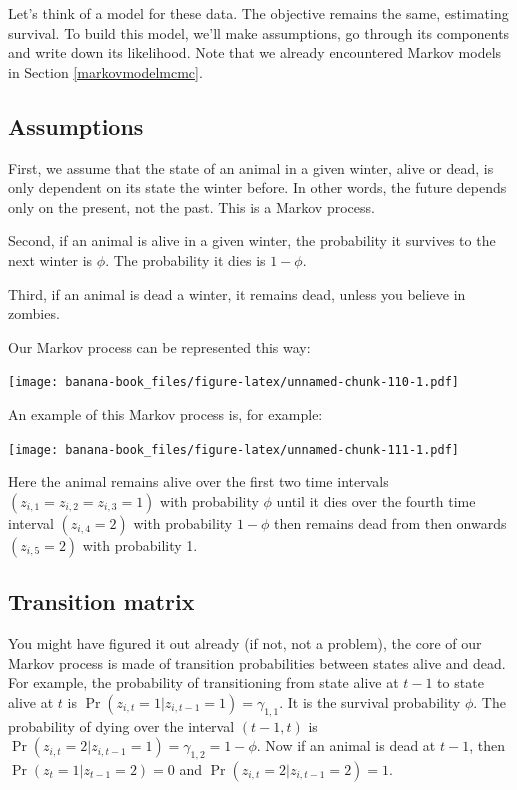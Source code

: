 \documentclass[
  12pt,
]{krantz}
\begin{document}
Let's think of a model for these data. The objective remains the same, estimating survival. To build this model, we'll make assumptions, go through its components and write down its likelihood. Note that we already encountered Markov models in Section \ref{markovmodelmcmc}.

\hypertarget{assumptions}{%
\subsection{Assumptions}\label{assumptions}}

First, we assume that the state of an animal in a given winter, alive or dead, is only dependent on its state the winter before. In other words, the future depends only on the present, not the past. This is a Markov process.

Second, if an animal is alive in a given winter, the probability it survives to the next winter is \(\phi\). The probability it dies is \(1 - \phi\).

Third, if an animal is dead a winter, it remains dead, unless you believe in zombies.

Our Markov process can be represented this way:

\texttt{[image: banana-book\_files/figure-latex/unnamed-chunk-110-1.pdf]}

An example of this Markov process is, for example:

\texttt{[image: banana-book\_files/figure-latex/unnamed-chunk-111-1.pdf]}

Here the animal remains alive over the first two time intervals \((z_{i,1} = z_{i,2} = z_{i,3} = 1)\) with probability \(\phi\) until it dies over the fourth time interval \((z_{i,4} = 2)\) with probability \(1-\phi\) then remains dead from then onwards \((z_{i,5} = 2)\) with probability 1.

\hypertarget{transition-matrix}{%
\subsection{Transition matrix}\label{transition-matrix}}

You might have figured it out already (if not, not a problem), the core of our Markov process is made of transition probabilities between states alive and dead. For example, the probability of transitioning from state alive at \(t-1\) to state alive at \(t\) is \(\Pr(z_{i,t} = 1 | z_{i,t-1} = 1) = \gamma_{1,1}\). It is the survival probability \(\phi\). The probability of dying over the interval \((t-1, t)\) is \(\Pr(z_{i,t} = 2 | z_{i,t-1} = 1) = \gamma_{1,2} = 1 - \phi\). Now if an animal is dead at \(t-1\), then \(\Pr(z_t = 1 | z_{t-1} = 2) = 0\) and \(\Pr(z_{i,t} = 2 | z_{i,t-1} = 2) = 1\).
\end{document}
